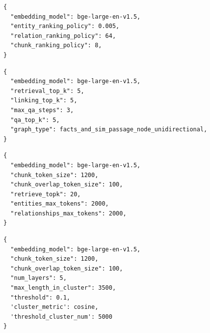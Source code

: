 \documentclass{article} %
\begin{document}
\begin{tcolorbox}[
    colframe=black,       
    colback=gray!15,       
    coltitle=white,       
    fonttitle=\bfseries,   
    title=FastGraphRAG Configuration
]
\begin{verbatim}
{
  "embedding_model": bge-large-en-v1.5,
  "entity_ranking_policy": 0.005,
  "relation_ranking_policy": 64,
  "chunk_ranking_policy": 8,
}
\end{verbatim}
\end{tcolorbox}

\begin{tcolorbox}[
    colframe=black,        
    colback=gray!15,    
    coltitle=white,       
    fonttitle=\bfseries,   
    title=HippoRAG2 Configuration
]
\begin{verbatim}
{
  "embedding_model": bge-large-en-v1.5,
  "retrieval_top_k": 5,
  "linking_top_k": 5,
  "max_qa_steps": 3,
  "qa_top_k": 5,
  "graph_type": facts_and_sim_passage_node_unidirectional,
}
\end{verbatim}
\end{tcolorbox}

\begin{tcolorbox}[
    colframe=black,      
    colback=gray!15,    
    coltitle=white,      
    fonttitle=\bfseries,  
    title=HippoRAG Configuration
]
\begin{verbatim}
{
  "embedding_model": bge-large-en-v1.5,
  "chunk_token_size": 1200,
  "chunk_overlap_token_size": 100,
  "retrieve_topk": 20,
  "entities_max_tokens": 2000,
  "relationships_max_tokens": 2000,
}
\end{verbatim}
\end{tcolorbox}

\begin{tcolorbox}[
    colframe=black,     
    colback=gray!15,       
    coltitle=white,      
    fonttitle=\bfseries,  
    title=RAPTOR Configuration
]
\begin{verbatim}
{
  "embedding_model": bge-large-en-v1.5,
  "chunk_token_size": 1200,
  "chunk_overlap_token_size": 100,
  "num_layers": 5,
  "max_length_in_cluster": 3500,
  "threshold": 0.1,
  'cluster_metric': cosine,
  'threshold_cluster_num': 5000
}
\end{verbatim}
\end{tcolorbox}


\end{document}
